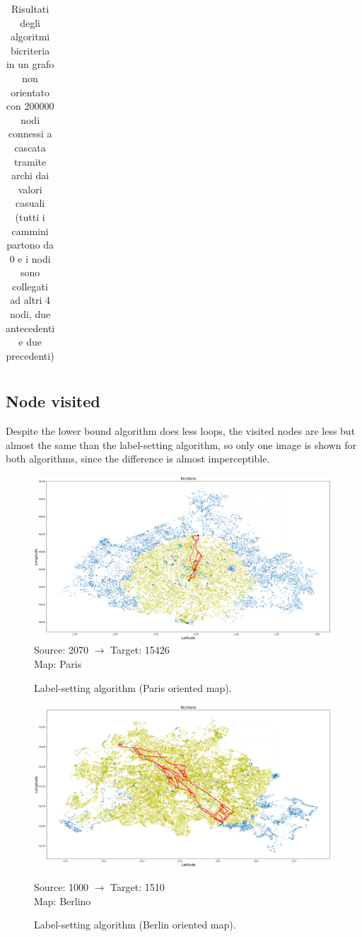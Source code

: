 \documentclass[a4paper,11pt]{report}
\begin{document}
\begin{table}[H]
\begin{tabular}{ |p{2cm}||p{2cm}|p{2.5cm}|p{3cm}|p{2.5cm}|  }
		\hline
		
	\end{tabular}
	\caption{Risultati degli algoritmi bicriteria in un grafo non orientato con 200000 nodi connessi a cascata tramite archi dai valori casuali (tutti i cammini partono da 0 e i nodi sono collegati ad altri 4 nodi, due antecedenti e due precedenti)}
	\label{tab:BidirectionalNotOriented}
\end{table}

\subsection{Node visited}
Despite the lower bound algorithm does less loops, the visited nodes are less but almost the same than the label-setting algorithm, so only one image is shown for both algorithms, since the difference is almost imperceptible.
\begin{figure}[H]
	\centering
	\includegraphics[width=\textwidth]{immaginiTest/Paris2070-15426Bicriteria.png}
	\label{fig:BicriteriaParis}
	Source: 2070 $\to$ Target: 15426\\Map: Paris
	\caption{Label-setting algorithm (Paris oriented map).}
\end{figure}
\begin{figure}[H]
	\centering
	\begin{minipage}[b]{\textwidth}
		\includegraphics[width=\textwidth]{immaginiTest/1000-1510BerlinBicriteria.png}
		\label{fig:BicriteriaBerlin}
	\end{minipage}
	Source: 1000 $\to$ Target: 1510\\Map: Berlino
	\caption{Label-setting algorithm (Berlin oriented map).}
\end{figure}
\end{document}

